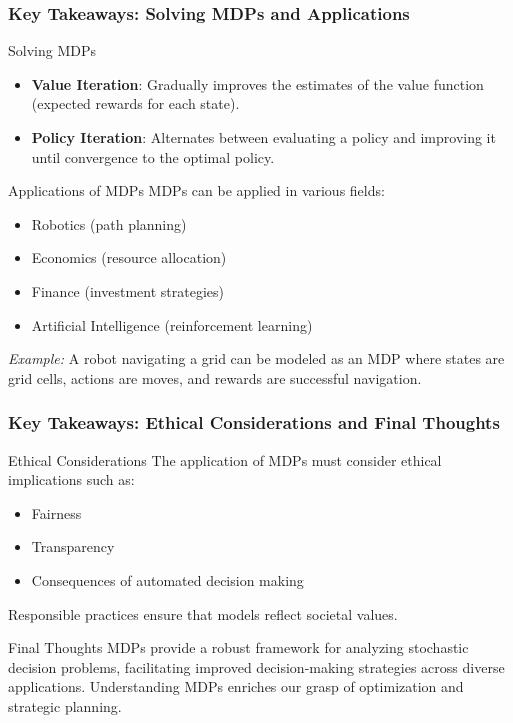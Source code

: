 \documentclass[aspectratio=169]{beamer}
\begin{document}
\begin{frame}[fragile]
    \frametitle{Key Takeaways: Solving MDPs and Applications}
    \begin{block}{Solving MDPs}
        \begin{itemize}
            \item \textbf{Value Iteration}: Gradually improves the estimates of the value function (expected rewards for each state).
            \item \textbf{Policy Iteration}: Alternates between evaluating a policy and improving it until convergence to the optimal policy.
        \end{itemize}
    \end{block}

    \begin{block}{Applications of MDPs}
        MDPs can be applied in various fields:
        \begin{itemize}
            \item Robotics (path planning)
            \item Economics (resource allocation)
            \item Finance (investment strategies)
            \item Artificial Intelligence (reinforcement learning)
        \end{itemize}
        \textit{Example:} A robot navigating a grid can be modeled as an MDP where states are grid cells, actions are moves, and rewards are successful navigation.
    \end{block}
\end{frame}

\begin{frame}[fragile]
    \frametitle{Key Takeaways: Ethical Considerations and Final Thoughts}
    \begin{block}{Ethical Considerations}
        The application of MDPs must consider ethical implications such as:
        \begin{itemize}
            \item Fairness
            \item Transparency
            \item Consequences of automated decision making
        \end{itemize}
        Responsible practices ensure that models reflect societal values.
    \end{block}

    \begin{block}{Final Thoughts}
        MDPs provide a robust framework for analyzing stochastic decision problems, facilitating improved decision-making strategies across diverse applications. Understanding MDPs enriches our grasp of optimization and strategic planning.
    \end{block}
\end{frame}
\end{document}
